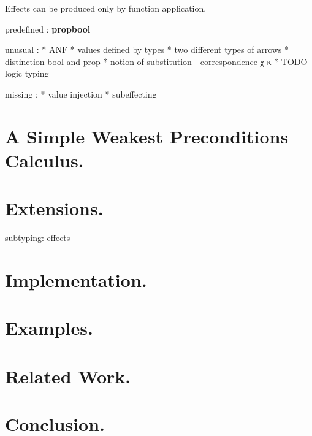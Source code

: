 \documentclass[a4paper]{llncs}
\newcommand{\propml}{{\bf prop}}
\newcommand{\boolml}{{\bf bool}}
\begin{document}
Effects can be produced only by function application.


predefined : \propml \boolml


unusual : 
* ANF 
* values defined by types
* two different types of arrows
* distinction bool and prop
* notion of substitution - correspondence χ κ
* TODO logic typing

missing : 
* value injection
* subeffecting

\section{A Simple Weakest Preconditions Calculus.}

\section{Extensions.}

subtyping: effects

\section{Implementation.}

\section{Examples.}

\section{Related Work.}

\section{Conclusion.}
\end{document}
